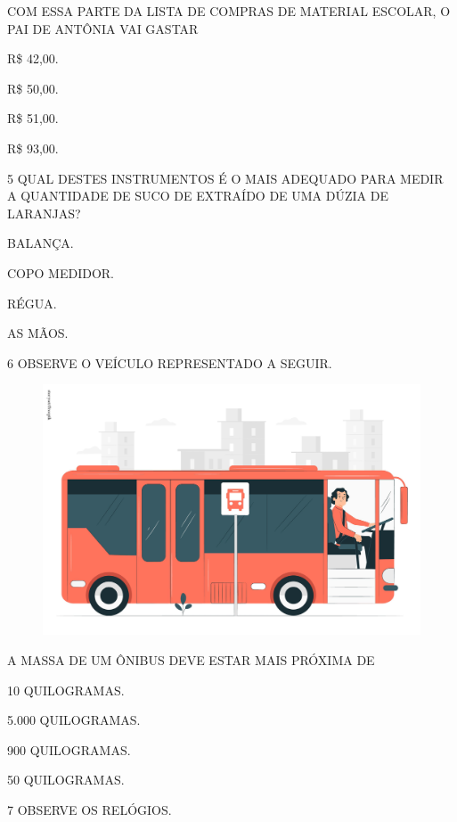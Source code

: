 \pagebreak
COM ESSA PARTE DA LISTA DE COMPRAS DE MATERIAL ESCOLAR, O PAI DE ANTÔNIA VAI GASTAR

\begin{escolha}[itemsep=0pt]
\item R\$ 42,00.

\item R\$ 50,00.

\item R\$ 51,00.

\item R\$ 93,00.
\end{escolha}

\num{5} QUAL DESTES INSTRUMENTOS É O MAIS ADEQUADO PARA MEDIR A QUANTIDADE DE SUCO DE EXTRAÍDO DE UMA DÚZIA DE LARANJAS?

\begin{escolha}[itemsep=0pt]
\item BALANÇA.

\item COPO MEDIDOR.

\item RÉGUA.

\item AS MÃOS.
\end{escolha}

\num{6} OBSERVE O VEÍCULO REPRESENTADO A SEGUIR.

\begin{figure}[htpb!]
\centering
\includegraphics[width=.3\textwidth]{./media/SAEB_1ANO_MAT_FIGURA138.png}
\end{figure}

A MASSA DE UM ÔNIBUS DEVE ESTAR MAIS PRÓXIMA DE

\begin{escolha}[itemsep=0pt]
\item 10 QUILOGRAMAS.

\item 5.000 QUILOGRAMAS.

\item 900 QUILOGRAMAS.

\item 50 QUILOGRAMAS.
\end{escolha}

\pagebreak
\num{7} OBSERVE OS RELÓGIOS.

